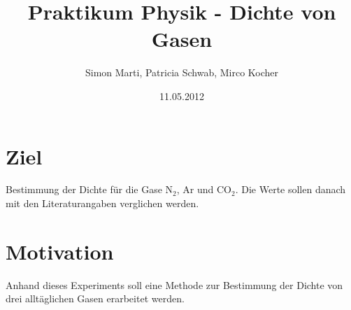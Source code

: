 \documentclass[12pt,a4paper]{article}
\title{Praktikum Physik - Dichte von Gasen}
\author{Simon Marti, Patricia Schwab, Mirco Kocher}
\date{11.05.2012}
\begin{document}
\maketitle

\section*{Ziel}
Bestimmung der Dichte f\"ur die Gase N$_2$, Ar und CO$_2$. Die Werte sollen danach mit den Literaturangaben verglichen werden.

\section*{Motivation}
Anhand dieses Experiments soll eine Methode zur Bestimmung der Dichte von drei allt\"aglichen Gasen erarbeitet werden.
\end{document}
